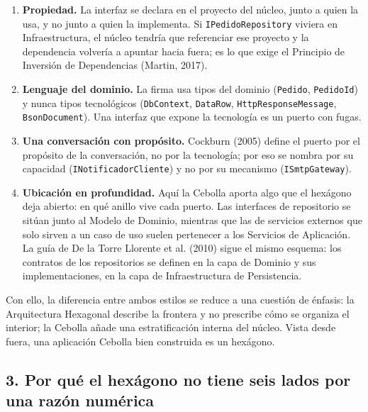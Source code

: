 \documentclass[11pt,a4paper]{article}
\begin{document}
\begin{enumerate}[leftmargin=1.4em]
\item \textbf{Propiedad.} La interfaz se declara en el proyecto del núcleo, junto a quien la
usa, y no junto a quien la implementa. Si \texttt{IPedidoRepository} viviera en
Infraestructura, el núcleo tendría que referenciar ese proyecto y la dependencia volvería a
apuntar hacia fuera; es lo que exige el Principio de Inversión de Dependencias
(Martin, 2017).
\item \textbf{Lenguaje del dominio.} La firma usa tipos del dominio (\texttt{Pedido},
\texttt{PedidoId}) y nunca tipos tecnológicos (\texttt{DbContext}, \texttt{DataRow},
\texttt{HttpResponseMessage}, \texttt{BsonDocument}). Una interfaz que expone la tecnología es
un puerto con fugas.
\item \textbf{Una conversación con propósito.} Cockburn (2005) define el puerto por el
propósito de la conversación, no por la tecnología; por eso se nombra por su capacidad
(\texttt{INotificadorCliente}) y no por su mecanismo (\texttt{ISmtpGateway}).
\item \textbf{Ubicación en profundidad.} Aquí la Cebolla aporta algo que el hexágono deja
abierto: en qué anillo vive cada puerto. Las interfaces de repositorio se sitúan junto al
Modelo de Dominio, mientras que las de servicios externos que solo sirven a un caso de uso
suelen pertenecer a los Servicios de Aplicación. La guía de De la Torre Llorente et al. (2010)
sigue el mismo esquema: los contratos de los repositorios se definen en la capa de Dominio y
sus implementaciones, en la capa de Infraestructura de Persistencia.
\end{enumerate}

Con ello, la diferencia entre ambos estilos se reduce a una cuestión de énfasis: la
Arquitectura Hexagonal describe la frontera y no prescribe cómo se organiza el interior; la
Cebolla añade una estratificación interna del núcleo. Vista desde fuera, una aplicación
Cebolla bien construida es un hexágono.

\subsection*{3. Por qué el hexágono no tiene seis lados por una razón numérica}
\end{document}
